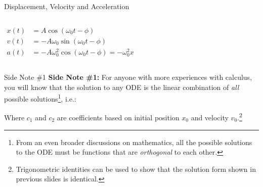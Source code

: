 \documentclass[12pt,compress,aspectratio=169]{beamer}
\begin{document}
\begin{frame}{Displacement, Velocity and Acceleration}
  \begin{columns}
    \begin{align*}
      x(t)&=A\cos(\omega_0 t-\phi)\\
      v(t)&=-A\omega_0\sin(\omega_0 t-\phi)\\
      a(t)&=-A\omega_0^2\cos(\omega_0 t-\phi)=-\omega_0^2x
    \end{align*}

  \end{columns}
\end{frame}



\begin{frame}{Side Note \#1}
  \textbf{Side Note \#1:} For anyone with more experiences with calculus,
  you will know that the solution to any ODE is the linear combination of
  \emph{all} possible solutions\footnote{From an even broader discussions on
  mathematics, all the possible solutions to the ODE must be functions that are
  \emph{orthogonal} to each other.}, i.e.:


  \vspace{-.1in}Where $c_1$ and $c_2$ are coefficients based on initial
  position $x_0$ and velocity $v_0$.\footnote{Trigonometric identities can be
  used to show that the solution form shown in previous slides is identical.}
\end{frame}
\end{document}

